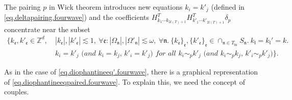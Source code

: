  The pairing $p$ in Wick theorem introduces new equations $k_{i}=k'_{j}$ (defined in \eqref{eq.deltapairing.fourwave}) and the coefficients $H^T_{k_1\cdots k_{2l(T)+1}} H^{T}_{k'_1\cdots k'_{2l(T)+1}} \delta_{p}$ concentrate near the subset 
 \begin{equation}\label{eq.diophantineeqpaired.fourwave}
 \begin{split}
  \{k_{\mathfrak{e}}, k'_{\mathfrak{e}}\in \mathbb{Z}^d,\ &|k_{\mathfrak{e}}|, |k'_{\mathfrak{e}}|\lesssim 1,\ \forall \mathfrak{e}: |\Omega_{\mathfrak{n}}|,|\Omega'_{\mathfrak{n}}|\lesssim \omega,\ \forall \mathfrak{n}. \ \{k_{\mathfrak{e}}\}_{\mathfrak{e}}, \{k'_{\mathfrak{e}}\}_{\mathfrak{e}}\in \cap_{\mathfrak{n}\in T_{\text{in}}} S_{\mathfrak{n}}.\ k_{\mathfrak{l}}=k_{\mathfrak{l}}'=k. \\
  &\textit{$k_{i}=k'_{j}$ (and $k_{i}=k_{j}$, $k'_{i}=k'_{j}$) for all $k_{i}\sim_{p}k'_{j}$ (and $k_{i}\sim_{p}k_{j}$, $k'_{i}\sim_{p}k'_{j}$)}\}.
 \end{split}
 \end{equation}
 
 As in the case of \eqref{eq.diophantineeq'.fourwave}, there is a graphical representation of \eqref{eq.diophantineeqpaired.fourwave}. To explain this, we need the concept of couples.
 
 
